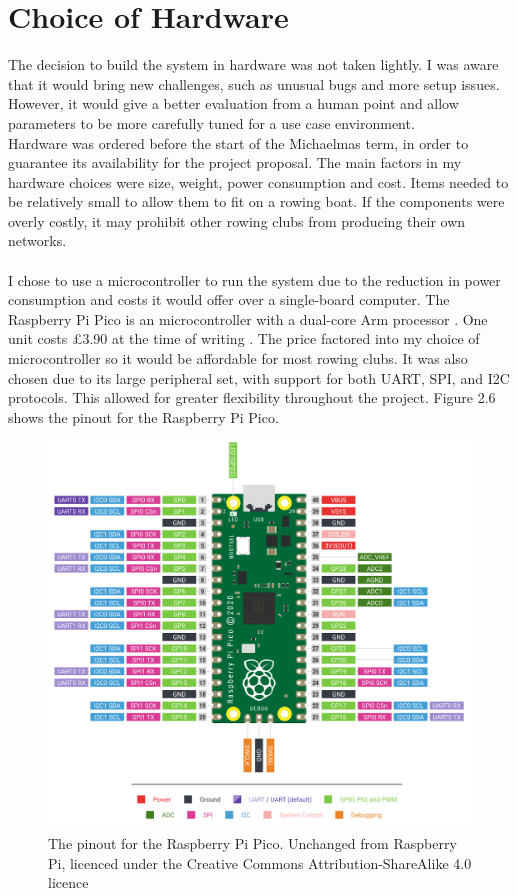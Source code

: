 \documentclass[12pt,a4paper]{report}
\begin{document}
\section{Choice of Hardware}
The decision to build the system in hardware was not taken lightly. I was aware that it would bring new challenges, such as unusual bugs and more setup issues. However, it would give a better evaluation from a human point and allow parameters to be more carefully tuned for a use case environment. \\
Hardware was ordered before the start of the Michaelmas term, in order to guarantee its availability for the project proposal. The main factors in my hardware choices were size, weight, power consumption and cost. Items needed to be relatively small to allow them to fit on a rowing boat. If the components were overly costly, it may prohibit other rowing clubs from producing their own networks. \\ \\
I chose to use a microcontroller to run the system due to the reduction in power consumption and costs it would offer over a single-board computer. The Raspberry Pi Pico is an microcontroller with a dual-core Arm processor \cite{rp2040}. One unit costs £3.90 at the time of writing \cite{buypico}. The price factored into my choice of microcontroller so it would be affordable for most rowing clubs. It was also chosen due to its large peripheral set, with support for both UART, SPI, and I2C protocols. This allowed for greater flexibility throughout the project. Figure 2.6 shows the pinout for the Raspberry Pi Pico. 
\begin{figure}[h]
\begin{center}
\includegraphics[scale=0.2]{picopinout.png}
\end{center}
\caption{The pinout for the Raspberry Pi Pico. Unchanged from Raspberry Pi, licenced under the Creative Commons Attribution-ShareAlike 4.0 licence \cite{pinout}}
\end{figure}
\end{document}

